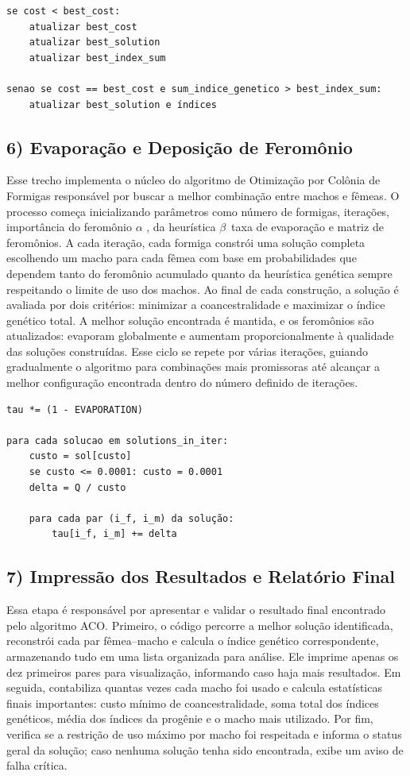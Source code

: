 \begin{verbatim}
se cost < best_cost:
    atualizar best_cost
    atualizar best_solution
    atualizar best_index_sum

senao se cost == best_cost e sum_indice_genetico > best_index_sum:
    atualizar best_solution e índices
\end{verbatim}
\vspace{1em}

\subsection*{6) Evaporação e Deposição de Feromônio}
Esse trecho implementa o núcleo do algoritmo de Otimização por Colônia de Formigas responsável por buscar a melhor combinação entre machos e fêmeas. O processo começa inicializando parâmetros como número de formigas, iterações, importância do feromônio \(\alpha\) , da heurística \(\beta\)\, taxa de evaporação e matriz de feromônios. A cada iteração, cada formiga constrói uma solução completa escolhendo um macho para cada fêmea com base em probabilidades que dependem tanto do feromônio acumulado quanto da heurística genética sempre respeitando o limite de uso dos machos. Ao final de cada construção, a solução é avaliada por dois critérios: minimizar a coancestralidade e maximizar o índice genético total. A melhor solução encontrada é mantida, e os feromônios são atualizados: evaporam globalmente e aumentam proporcionalmente à qualidade das soluções construídas. Esse ciclo se repete por várias iterações, guiando gradualmente o algoritmo para combinações mais promissoras até alcançar a melhor configuração encontrada dentro do número definido de iterações.

\begin{verbatim}
tau *= (1 - EVAPORATION)

para cada solucao em solutions_in_iter:
    custo = sol[custo]
    se custo <= 0.0001: custo = 0.0001
    delta = Q / custo

    para cada par (i_f, i_m) da solução:
        tau[i_f, i_m] += delta
\end{verbatim}
\vspace{1em}

\subsection*{7) Impressão dos Resultados e Relatório Final}
Essa etapa é responsável por apresentar e validar o resultado final encontrado pelo algoritmo ACO. Primeiro, o código percorre a melhor solução identificada, reconstrói cada par fêmea–macho e calcula o índice genético correspondente, armazenando tudo em uma lista organizada para análise. Ele imprime apenas os dez primeiros pares para visualização, informando caso haja mais resultados. Em seguida, contabiliza quantas vezes cada macho foi usado e calcula estatísticas finais importantes: custo mínimo de coancestralidade, soma total dos índices genéticos, média dos índices da progênie e o macho mais utilizado. Por fim, verifica se a restrição de uso máximo por macho foi respeitada e informa o status geral da solução; caso nenhuma solução tenha sido encontrada, exibe um aviso de falha crítica.

